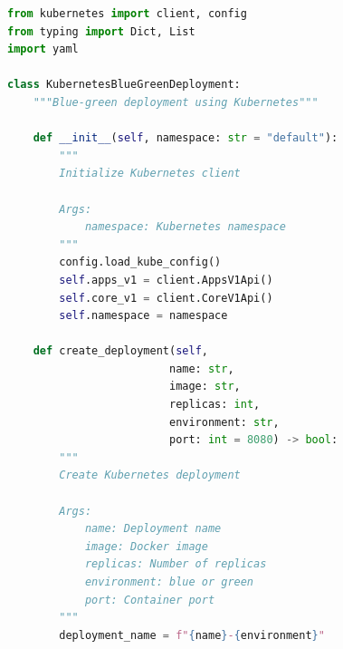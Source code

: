 \begin{lstlisting}[language=Python, caption=Kubernetes Blue-Green Deployment]
from kubernetes import client, config
from typing import Dict, List
import yaml

class KubernetesBlueGreenDeployment:
    """Blue-green deployment using Kubernetes"""

    def __init__(self, namespace: str = "default"):
        """
        Initialize Kubernetes client

        Args:
            namespace: Kubernetes namespace
        """
        config.load_kube_config()
        self.apps_v1 = client.AppsV1Api()
        self.core_v1 = client.CoreV1Api()
        self.namespace = namespace

    def create_deployment(self,
                         name: str,
                         image: str,
                         replicas: int,
                         environment: str,
                         port: int = 8080) -> bool:
        """
        Create Kubernetes deployment

        Args:
            name: Deployment name
            image: Docker image
            replicas: Number of replicas
            environment: blue or green
            port: Container port
        """
        deployment_name = f"{name}-{environment}"


\end{lstlisting}
